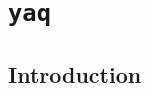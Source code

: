 \chapter{\texttt{yaq}} \label{cha:yaq}

\clearpage

\section{Introduction}  %

\clearpage

\clearpage
